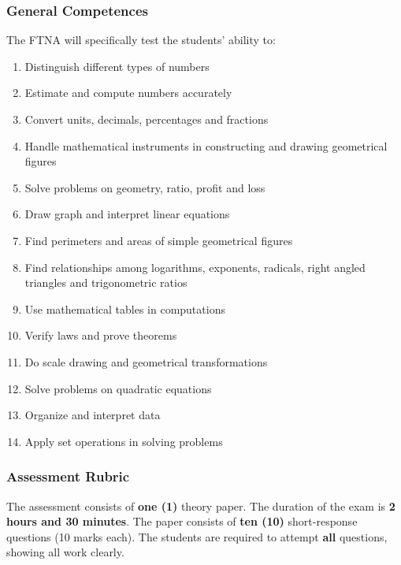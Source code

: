 \subsubsection{General Competences}
\noindent The FTNA will specifically test the students' ability to:
\begin{enumerate}[topsep=1ex,itemsep=0ex,partopsep=1ex,parsep=1ex]
	\item Distinguish different types of numbers
	\item Estimate and compute numbers accurately
	\item Convert units, decimals, percentages and fractions
	\item Handle mathematical instruments in constructing and drawing geometrical figures
	\item Solve problems on geometry, ratio, profit and loss
	\item Draw graph and interpret linear equations
	\item Find perimeters and areas of simple geometrical figures
	\item Find relationships among logarithms, exponents, radicals, right angled triangles and trigonometric ratios
	\item Use mathematical tables in computations
	\item Verify laws and prove theorems
	\item Do scale drawing and geometrical transformations
	\item Solve problems on quadratic equations
	\item Organize and interpret data
	\item Apply set operations in solving problems
\end{enumerate}

\subsubsection{Assessment Rubric}
\noindent The assessment consists of \textbf{one (1)} theory paper. The duration of the exam is \textbf{2 hours and 30 minutes}. The paper consists of \textbf{ten (10)} short-response questions (10 marks each). The students are required to attempt \textbf{all} questions, showing all work clearly.  

